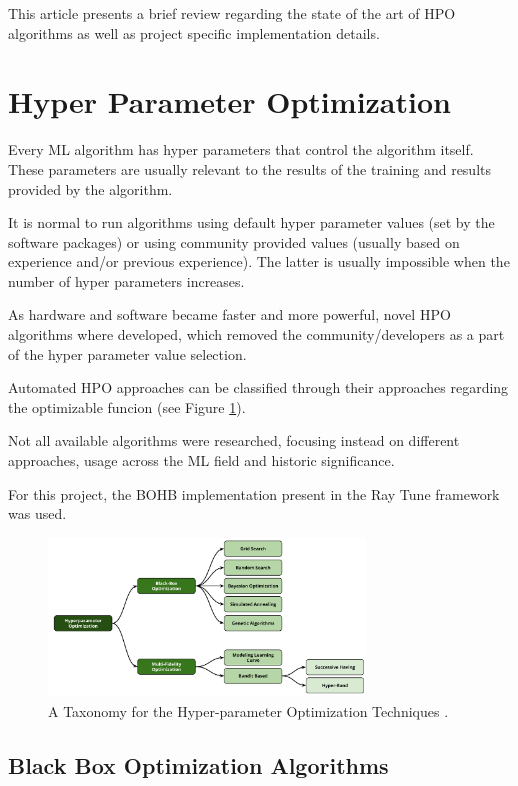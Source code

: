 \documentclass[runningheads]{llncs}
\begin{document}
This article presents a brief review regarding the state of the art of HPO algorithms as well as project specific implementation details.

\section{Hyper Parameter Optimization}

Every ML algorithm has hyper parameters that control the algorithm itself. These parameters are usually relevant to the results of the training and results provided by the algorithm.

It is normal to run algorithms using default hyper parameter values (set by the software packages) or using community provided values (usually based on experience and/or previous experience). The latter is usually impossible when the number of hyper parameters increases.

As hardware and software became faster and more powerful, novel HPO algorithms where developed, which removed the community/developers as a part of the hyper parameter value selection.

Automated HPO approaches can be classified through their approaches regarding the optimizable funcion (see Figure \ref{fig:state_of_art_taxonomy}).

Not all available algorithms were researched, focusing instead on different approaches, usage across the ML field and historic significance.

For this project, the BOHB implementation present in the Ray Tune framework was used.

\begin{figure}
	\centering
	\includegraphics[width=0.75\textwidth]{images/state_art-taxonomy_optimizers.png}
	\caption{A Taxonomy for the Hyper-parameter Optimization Techniques \cite{elshawi2019automated}.}
	\label{fig:state_of_art_taxonomy}
\end{figure}

\subsection{Black Box Optimization Algorithms}
\end{document}
